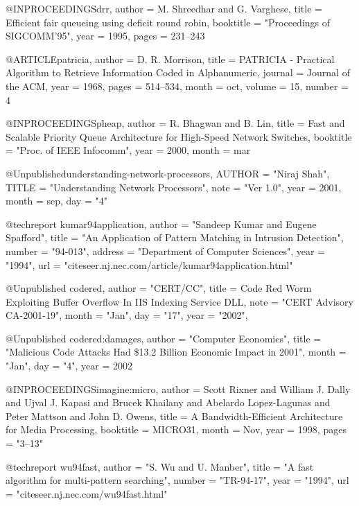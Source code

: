 @INPROCEEDINGS{drr,
           author = {M. Shreedhar and G. Varghese},
           title = {Efficient fair queueing using deficit round robin},
           booktitle = "Proceedings of SIGCOMM'95",
           year = 1995,
           pages = {231--243}
}

@ARTICLE{patricia,
  author =       {D. R. Morrison},
  title =        {PATRICIA - Practical Algorithm to Retrieve Information Coded in Alphanumeric},
  journal =      {Journal of the ACM},
  year =         1968,
  pages =        {514--534},
  month =        oct,
  volume = 	 15,
  number = 	 4
}

@INPROCEEDINGS{pheap,
           author = {R. Bhagwan and B. Lin},
           title = {Fast and Scalable Priority Queue Architecture for High-Speed Network Switches},
           booktitle = "Proc. of IEEE Infocomm",
           year = 2000,
	   month = mar
}


@Unpublished{understanding-network-processors,
        AUTHOR = "Niraj Shah",
        TITLE = "Understanding Network Processors",
        note = "Ver 1.0",
        year =  2001,
        month = sep,
	day = "4"
}

@techreport{ kumar94application,
    author = "Sandeep Kumar and Eugene Spafford",
    title = "{An Application of Pattern Matching in Intrusion Detection}",
    number = "94-013",
    address = "Department of Computer Sciences",
    year = "1994",
    url = "citeseer.nj.nec.com/article/kumar94application.html" 
}

@Unpublished{ codered,
    author = "CERT/CC",
    title = { {Code Red} Worm Exploiting Buffer Overflow In {IIS} Indexing Service {DLL}},
    note = "CERT Advisory CA-2001-19",
    month = "Jan",
    day = "17",
    year = "2002",
}

@Unpublished{ codered:damages,
    author = "Computer Economics",
    title = "Malicious Code Attacks Had \$13.2 Billion Economic Impact in 2001",
    month = "Jan",
    day = "4",
    year = 2002
}

@INPROCEEDINGS{imagine:micro,
           author = {Scott Rixner and William J. Dally and Ujval J. Kapasi and Brucek Khailany and Abelardo Lopez-Lagunas and Peter Mattson and John D. Owens},
           title = {A Bandwidth-Efficient Architecture for Media Processing},
           booktitle = MICRO31,
           month = Nov,
           year = 1998,
           pages = "3--13"           
}

@techreport{ wu94fast,
    author = "S. Wu and U. Manber",
    title = "A fast algorithm for multi-pattern searching",
    number = "TR-94-17",
    year = "1994",
    url = "citeseer.nj.nec.com/wu94fast.html" }

